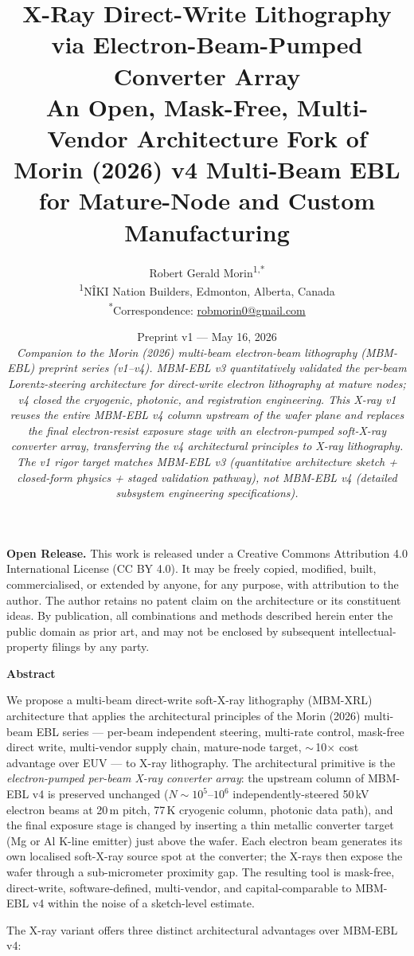 \documentclass[11pt,letterpaper]{article}
\title{\Large \textbf{X-Ray Direct-Write Lithography via Electron-Beam-Pumped Converter Array}\\[0.3em]
  \large An Open, Mask-Free, Multi-Vendor Architecture Fork of\\
  Morin (2026) v4 Multi-Beam EBL for Mature-Node and Custom Manufacturing}
\author{Robert Gerald Morin\textsuperscript{1,*}\\[0.4em]
  {\small \textsuperscript{1}N\^{I}KI Nation Builders, Edmonton, Alberta, Canada}\\
  {\small \textsuperscript{*}Correspondence: \href{mailto:robmorin0@gmail.com}{robmorin0@gmail.com}}}
\date{Preprint v1 --- May 16, 2026\\[0.3em]
  {\small\textit{Companion to the Morin (2026) multi-beam electron-beam lithography (MBM-EBL) preprint series (v1--v4). MBM-EBL v3 quantitatively validated the per-beam Lorentz-steering architecture for direct-write electron lithography at mature nodes; v4 closed the cryogenic, photonic, and registration engineering. This X-ray v1 reuses the entire MBM-EBL v4 column upstream of the wafer plane and replaces the final electron-resist exposure stage with an electron-pumped soft-X-ray converter array, transferring the v4 architectural principles to X-ray lithography. The v1 rigor target matches MBM-EBL v3 (quantitative architecture sketch + closed-form physics + staged validation pathway), not MBM-EBL v4 (detailed subsystem engineering specifications).}}}
\begin{document}
\maketitle
\thispagestyle{fancy}

\begin{mdframed}[linewidth=0.5pt,backgroundcolor=gray!4]
\textbf{Open Release.} This work is released under a Creative Commons Attribution 4.0 International License (CC BY 4.0). It may be freely copied, modified, built, commercialised, or extended by anyone, for any purpose, with attribution to the author. The author retains no patent claim on the architecture or its constituent ideas. By publication, all combinations and methods described herein enter the public domain as prior art, and may not be enclosed by subsequent intellectual-property filings by any party.
\end{mdframed}

\begin{center}\textbf{Abstract}\end{center}
\noindent
We propose a multi-beam direct-write soft-X-ray lithography (MBM-XRL) architecture that applies the architectural principles of the Morin (2026) multi-beam EBL series --- per-beam independent steering, multi-rate control, mask-free direct write, multi-vendor supply chain, mature-node target, $\sim$\,10$\times$ cost advantage over EUV --- to X-ray lithography. The architectural primitive is the \textit{electron-pumped per-beam X-ray converter array}: the upstream column of MBM-EBL v4 is preserved unchanged ($N \sim 10^5$--$10^6$ independently-steered 50\,kV electron beams at 20\,\textmu m pitch, 77\,K cryogenic column, photonic data path), and the final exposure stage is changed by inserting a thin metallic converter target (Mg or Al K-line emitter) just above the wafer. Each electron beam generates its own localised soft-X-ray source spot at the converter; the X-rays then expose the wafer through a sub-micrometer proximity gap. The resulting tool is mask-free, direct-write, software-defined, multi-vendor, and capital-comparable to MBM-EBL v4 within the noise of a sketch-level estimate.

The X-ray variant offers three distinct architectural advantages over MBM-EBL v4:
\end{document}
